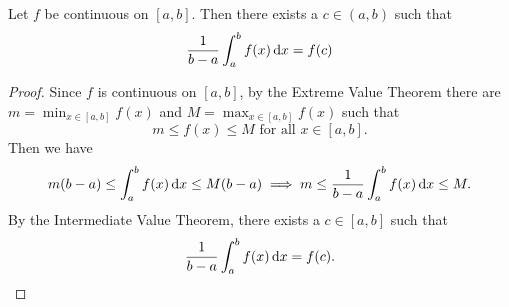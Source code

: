 \begin{theorem} 
    Let $f$ be continuous on $[a,b]$. Then there exists a $c\in (a,b)$ such that
    \begin{align*}
        \frac{1}{b-a}\int_{a}^{b} f(x) \operatorname*{d\!} x = f(c)
    \end{align*}
\end{theorem}
\begin{proof}
    Since $f$ is continuous on $[a,b]$, by the Extreme Value Theorem there are $m=\min_{x\in[a,b]} f(x)$ and $M=\max_{x\in[a,b]} f(x)$ such that
    \[
        m \le f(x) \le M \text{ for all } x\in[a,b].
    \]
    Then we have
    \begin{align*}
        m(b-a) \le \int_{a}^{b} f(x) \operatorname*{d\!} x \le M(b-a) \implies m \le \frac{1}{b-a}\int_{a}^{b} f(x) \operatorname*{d\!} x \le M.
    \end{align*}
    By the Intermediate Value Theorem, there exists a $c\in[a,b]$ such that \begin{align*}
        \frac{1}{b-a}\int_{a}^{b} f(x) \operatorname*{d\!} x = f(c).
    \end{align*}
\end{proof}

